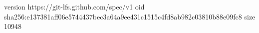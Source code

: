 version https://git-lfs.github.com/spec/v1
oid sha256:e137381aff06e5744437bec3a64a9ee431c1515c4fd8ab982c03810b88e09fc8
size 10948
